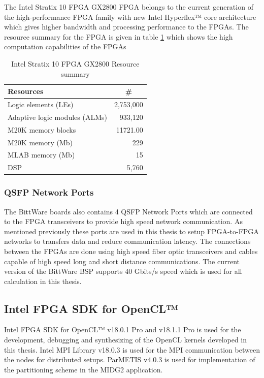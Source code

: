 The Intel Stratix 10 FPGA GX2800 FPGA belongs to the current generation of the high-performance FPGA
family with new Intel Hyperflex™ core architecture which gives higher bandwidth and processing
performance to the FPGAs. The resource summary for the FPGA is given in table \ref{tab:res_sum}
which shows the high computation capabilities of the FPGAs
\begin{table}[]
    \centering
    \caption{Intel Stratix 10 FPGA GX2800 Resource summary}
    \label{tab:res_sum}
    \begin{tabular}{lr}
    \hline
    \textbf{Resources} & \multicolumn{1}{c}{\textbf{\#}} \\ \hline
    Logic elements (LEs) & 2,753,000 \\ \hline
    Adaptive logic modules (ALMs) & 933,120 \\ \hline
    M20K memory blocks & 11721.00 \\ \hline
    M20K memory (Mb) & 229 \\ \hline
    MLAB memory (Mb) & 15 \\ \hline
    DSP & 5,760 \\ \hline
    \end{tabular}%
\end{table}

\subsubsection*{QSFP Network Ports}

The BittWare boards also contains 4 QSFP Network Ports which
are connected to the FPGA transceivers to provide high speed network communication. As mentioned
previously these ports are used in this thesis to setup FPGA-to-FPGA networks to transfers data
and reduce communication latency. The connections between the FPGAs are done using
high speed fiber optic transceivers and cables capable of high speed long and short distance communications.
The current version of the BittWare BSP supports 40 Gbits/s speed which is used for all calculation in this thesis.

\subsection{Intel FPGA SDK for OpenCL™}

Intel FPGA SDK for OpenCL™ v18.0.1 Pro and v18.1.1 Pro is used for the development,
debugging and synthesizing of the OpenCL kernels developed in this thesis.
Intel MPI Library v18.0.3 is used for the MPI communication between the nodes
for distributed setups. ParMETIS v4.0.3 is used for implementation of the partitioning
scheme in the MIDG2 application.

